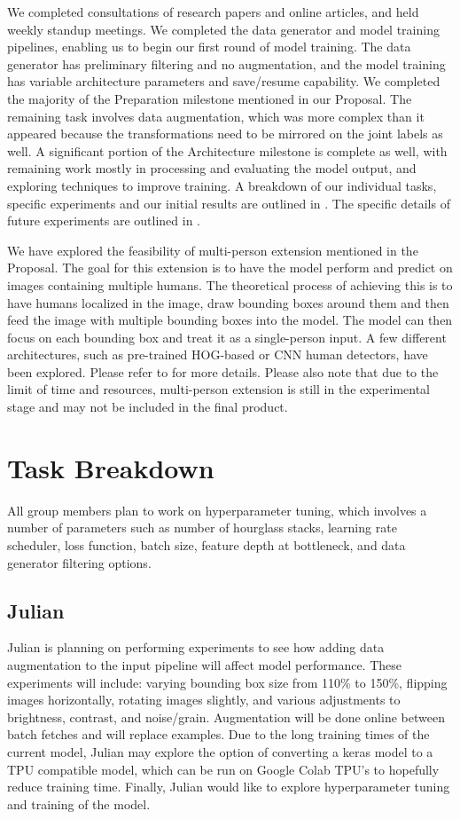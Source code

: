 \documentclass[11pt, letterpaper]{article}
\begin{document}
We completed consultations of research papers and online articles, and held weekly standup meetings. We completed the data generator and model training pipelines, enabling us to begin our first round of model training. The data generator has preliminary filtering and no augmentation, and the model training has variable architecture parameters and save/resume capability. We completed the majority of the Preparation milestone mentioned in our Proposal. The remaining task involves data augmentation, which was more complex than it appeared because the transformations need to be mirrored on the joint labels as well. A significant portion of the Architecture milestone is complete as well, with remaining work mostly in processing and evaluating the model output, and exploring techniques to improve training. A breakdown of our individual tasks, specific experiments and our initial results are outlined in . The specific details of future experiments are outlined in . 

We have explored the feasibility of multi-person extension mentioned in the Proposal. The goal for this extension is to have the model perform and predict on images containing multiple humans. The theoretical process of achieving this is to have humans localized in the image, draw bounding boxes around them and then feed the image with multiple bounding boxes into the model. The model can then focus on each bounding box and treat it as a single-person input. A few different architectures, such as pre-trained HOG-based or CNN human detectors, have been explored. Please refer to  for more details. Please also note that due to the limit of time and resources, multi-person extension is still in the experimental stage and may not be included in the final product.


\section{Task Breakdown}
\label{SectionTaskB}

All group members plan to work on hyperparameter tuning, which involves a number of parameters such as number of hourglass stacks, learning rate scheduler, loss function, batch size, feature depth at bottleneck, and data generator filtering options.
\subsection{Julian}
Julian is planning on performing experiments to see how adding data augmentation to the input pipeline will affect model performance. These experiments will include: varying bounding box size from 110\% to 150\%, flipping images horizontally, rotating images slightly, and various adjustments to brightness, contrast, and noise/grain. Augmentation will be done online between batch fetches and will replace examples. Due to the long training times of the current model, Julian may explore the option of converting a keras model to a TPU compatible model, which can be run on Google Colab TPU’s to hopefully reduce training time. Finally, Julian would like to explore hyperparameter tuning and training of the model.
\end{document}
